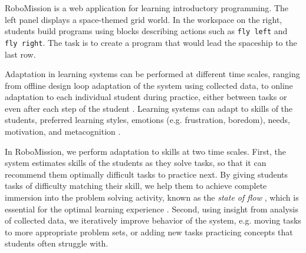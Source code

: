
%
  {RoboMission is a web application for learning introductory programming.
   The left panel displays a space-themed grid world. In the workspace on
   the right, students build programs using blocks describing actions
   such as \texttt{fly left} and \texttt{fly right}.
   The task is to create a program that would lead the spaceship to the last row.}

Adaptation in learning systems can be performed at different time scales,
ranging from offline design loop adaptation of the system using
collected data, to online adaptation to each individual student during practice,
either between tasks or even after each step of the student
\cite{adaptive-learning-grid}.
Learning systems can adapt to skills of the students, preferred learning styles,
emotions (e.g. frustration, boredom), needs, motivation, and metacognition
\cite{affect-sensor-free,its-review-2010}.

In RoboMission, we perform adaptation to skills at two time scales.
First, the system estimates skills of the students as they solve tasks,
so that it can recommend them optimally difficult tasks to practice next.
By giving students tasks of difficulty matching their skill,
we help them to achieve complete immersion into the problem solving
activity, known as  %
the \emph{state of flow} \cite{flow},
which is essential for the optimal learning experience
\cite{adaptive-practice}.
Second, using insight from analysis of collected data,
we iteratively improve behavior of the system,
e.g. moving tasks to more appropriate problem sets,
or adding new tasks practicing concepts that students often struggle with.



